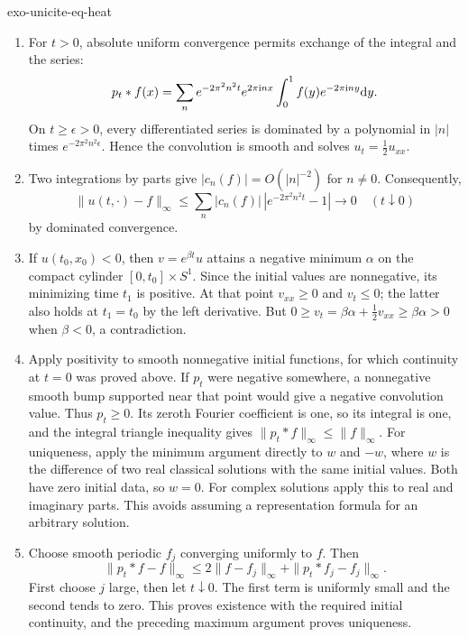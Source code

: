 \begin{correction}{exo-unicite-eq-heat}
\begin{enumerate}
\item For $t>0$, absolute uniform convergence permits exchange of the integral
and the series:
\[
 p_t*f(x)=\sum_n e^{-2\pi^2n^2t}e^{2\pi\mathrm{i} nx}
          \int_0^1f(y)e^{-2\pi\mathrm{i} ny}\mathrm{d} y.
\]
On $t\geq\epsilon>0$, every differentiated series is dominated by a
polynomial in $|n|$ times $e^{-2\pi^2n^2\epsilon}$. Hence the convolution
is smooth and solves $u_t=\tfrac12u_{xx}$.
\item Two integrations by parts give $|c_n(f)|=O(|n|^{-2})$ for $n\ne0$.
Consequently,
\[
 \|u(t,\cdot)-f\|_\infty
 \leq\sum_n|c_n(f)|\,|e^{-2\pi^2n^2t}-1|\longrightarrow0
 \quad(t\downarrow0)
\]
by dominated convergence.
\item If $u(t_0,x_0)<0$, then $v=e^{\beta t}u$ attains a negative minimum
$\alpha$ on the compact cylinder $[0,t_0]\times S^1$.
Since the initial values are nonnegative, its minimizing time $t_1$ is
positive. At that point $v_{xx}\geq0$ and $v_t\leq0$; the latter also
holds at $t_1=t_0$ by the left derivative. But
$0\geq v_t=\beta\alpha+\tfrac12v_{xx}\geq\beta\alpha>0$
when $\beta<0$, a contradiction.
\item Apply positivity to smooth nonnegative initial functions, for which
continuity at $t=0$ was proved above. If $p_t$ were negative somewhere,
a nonnegative smooth bump supported near that point would give a negative
convolution value. Thus $p_t\geq0$. Its zeroth Fourier coefficient is one,
so its integral is one, and the integral triangle inequality gives
$\|p_t*f\|_\infty\leq\|f\|_\infty$.
For uniqueness, apply the minimum argument directly to $w$ and $-w$, where
$w$ is the difference of two real classical solutions with the same initial
values. Both have zero initial data, so $w=0$. For complex solutions apply
this to real and imaginary parts. This avoids assuming a representation
formula for an arbitrary solution.
\item Choose smooth periodic $f_j$ converging uniformly to $f$. Then
\[
 \|p_t*f-f\|_\infty
 \leq2\|f-f_j\|_\infty+\|p_t*f_j-f_j\|_\infty.
\]
First choose $j$ large, then let $t\downarrow0$. The first term is uniformly
small and the second tends to zero. This proves existence with the required
initial continuity, and the preceding maximum argument proves uniqueness.
\end{enumerate}
\end{correction}

